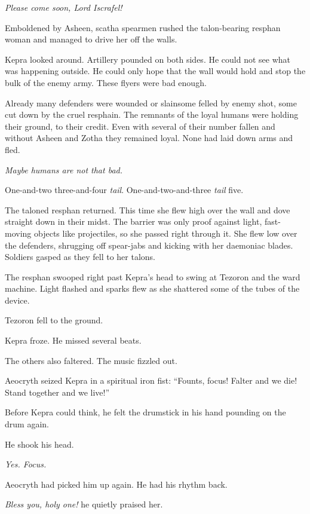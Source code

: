 \documentclass
  [a4paper,
   12pt,
   oneside
  ]%
  {article}
\newcommand{\drum}[1]{\textsf{#1}}
\begin{document}
\emph{Please come soon, Lord Iscrafel!}

Emboldened by Asheen, scatha spearmen rushed the talon-bearing resphan woman and managed to drive her off the walls. 

Kepra looked around. 
Artillery pounded on both sides.
He could not see what was happening outside. 
He could only hope that the wall would hold and stop the bulk of the enemy army.
These flyers were bad enough.

Already many defenders were wounded or slain\dash{}some felled by enemy shot, some cut down by the cruel resphain. 
The remnants of the loyal humans were holding their ground, to their credit. 
Even with several of their number fallen and without Asheen and Zotha they remained loyal. None had laid down arms and fled. 

\emph{Maybe humans are not that bad.}

\drum{One-and-two three-and-four \emph{tail}. One-and-two-and-three \emph{tail} five.}

The taloned resphan returned. This time she flew high over the wall and dove straight down in their midst. 
The barrier was only proof against light, fast-moving objects like projectiles, so she passed right through it. 
She flew low over the defenders, shrugging off spear-jabs and kicking with her daemoniac blades. 
Soldiers gasped as they fell to her talons.

The resphan swooped right past Kepra’s head to swing at Tezoron and the ward machine. 
Light flashed and sparks flew as she shattered some of the tubes of the device. 

Tezoron fell to the ground. 

Kepra froze. He missed several beats. 

The others also faltered. The music fizzled out.

Aeocryth seized Kepra in a spiritual iron fist: 
``Founts, focus! Falter and we die! Stand together and we live!'' 

Before Kepra could think, he felt the drumstick in his hand pounding on the drum again. 

He shook his head. 

\emph{Yes. Focus.} 

Aeocryth had picked him up again. He had his rhythm back. 

\emph{Bless you, holy one!} he quietly praised her.
\end{document}
